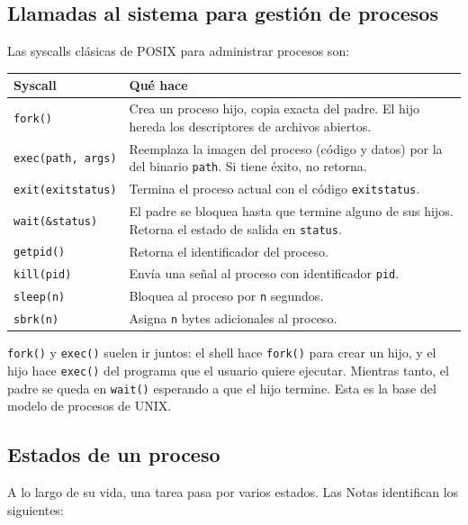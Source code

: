 \documentclass[11pt,a4paper]{article}
\begin{document}
\subsection{Llamadas al sistema para gestión de procesos}

Las syscalls clásicas de POSIX para administrar procesos son:

\begin{center}
\small
\begin{tabular}{@{}lp{8.5cm}@{}}
\toprule
Syscall & Qué hace \\
\midrule
\texttt{fork()} & Crea un proceso hijo, copia exacta del padre. El hijo hereda los descriptores de archivos abiertos. \\
\texttt{exec(path, args)} & Reemplaza la imagen del proceso (código y datos) por la del binario \texttt{path}. Si tiene éxito, no retorna. \\
\texttt{exit(exitstatus)} & Termina el proceso actual con el código \texttt{exitstatus}. \\
\texttt{wait(\&status)} & El padre se bloquea hasta que termine alguno de sus hijos. Retorna el estado de salida en \texttt{status}. \\
\texttt{getpid()} & Retorna el identificador del proceso. \\
\texttt{kill(pid)} & Envía una señal al proceso con identificador \texttt{pid}. \\
\texttt{sleep(n)} & Bloquea al proceso por \texttt{n} segundos. \\
\texttt{sbrk(n)} & Asigna \texttt{n} bytes adicionales al proceso. \\
\bottomrule
\end{tabular}
\end{center}

\begin{idea}
\texttt{fork()} y \texttt{exec()} suelen ir juntos: el shell hace
\texttt{fork()} para crear un hijo, y el hijo hace \texttt{exec()}
del programa que el usuario quiere ejecutar. Mientras tanto, el
padre se queda en \texttt{wait()} esperando a que el hijo termine.
Esta es la base del modelo de procesos de UNIX.
\end{idea}

\subsection{Estados de un proceso}

A lo largo de su vida, una tarea pasa por varios estados. Las Notas
identifican los siguientes:
\end{document}
